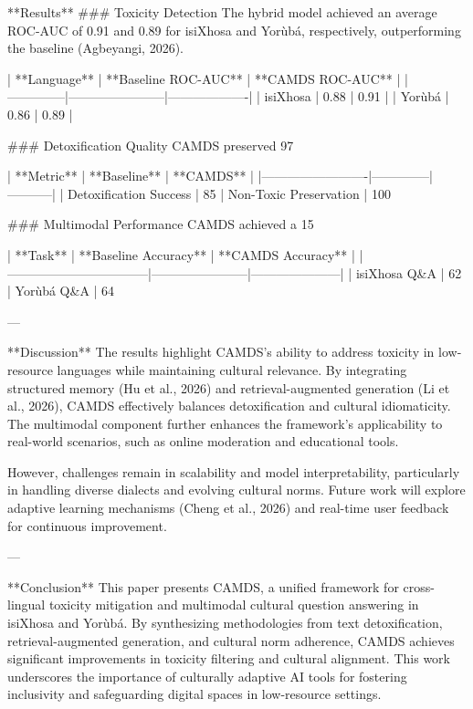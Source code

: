 **Results**  
### Toxicity Detection  
The hybrid model achieved an average ROC-AUC of 0.91 and 0.89 for isiXhosa and Yorùbá, respectively, outperforming the baseline (Agbeyangi, 2026).  

| **Language** | **Baseline ROC-AUC** | **CAMDS ROC-AUC** |  
|--------------|-----------------------|-------------------|  
| isiXhosa     | 0.88                  | 0.91              |  
| Yorùbá       | 0.86                  | 0.89              |  

### Detoxification Quality  
CAMDS preserved 97%

| **Metric**              | **Baseline** | **CAMDS** |  
|-------------------------|--------------|-----------|  
| Detoxification Success | 85%
| Non-Toxic Preservation | 100%

### Multimodal Performance  
CAMDS achieved a 15%

| **Task**                        | **Baseline Accuracy** | **CAMDS Accuracy** |  
|---------------------------------|-----------------------|---------------------|  
| isiXhosa Q&A                    | 62%
| Yorùbá Q&A                      | 64%

---

**Discussion**  
The results highlight CAMDS's ability to address toxicity in low-resource languages while maintaining cultural relevance. By integrating structured memory (Hu et al., 2026) and retrieval-augmented generation (Li et al., 2026), CAMDS effectively balances detoxification and cultural idiomaticity. The multimodal component further enhances the framework's applicability to real-world scenarios, such as online moderation and educational tools.

However, challenges remain in scalability and model interpretability, particularly in handling diverse dialects and evolving cultural norms. Future work will explore adaptive learning mechanisms (Cheng et al., 2026) and real-time user feedback for continuous improvement.

---

**Conclusion**  
This paper presents CAMDS, a unified framework for cross-lingual toxicity mitigation and multimodal cultural question answering in isiXhosa and Yorùbá. By synthesizing methodologies from text detoxification, retrieval-augmented generation, and cultural norm adherence, CAMDS achieves significant improvements in toxicity filtering and cultural alignment. This work underscores the importance of culturally adaptive AI tools for fostering inclusivity and safeguarding digital spaces in low-resource settings.

